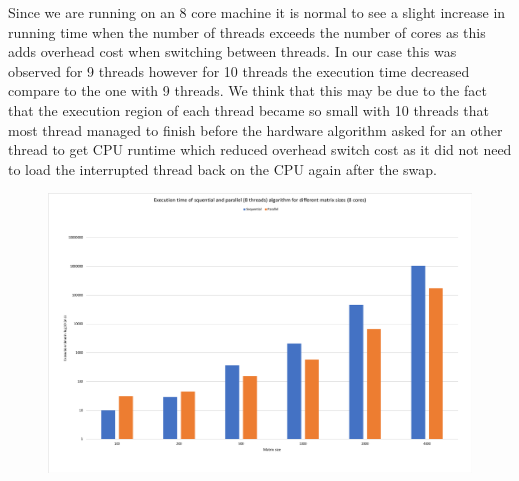 \documentclass[11pt,letterpaper]{exam}
\begin{document}
\begin{questions}
			\quad Since we are running on an 8 core machine it is normal to see a slight increase in running time when the number of threads exceeds the number of cores as this adds overhead cost when switching between threads. In our case this was observed for 9 threads however for 10 threads the execution time decreased compare to the one with 9 threads. We think that this may be due to the fact that the execution region of each thread became so small with 10 threads that most thread managed to finish before the hardware algorithm asked for an other thread to get CPU runtime which reduced overhead switch cost as it did not need to load the interrupted thread back on the CPU again after the swap.
			\begin{figure}[h!]
				\centering
				\includegraphics[scale=0.4]{ExectionParallelSequential}
			\end{figure}


\end{questions}
\end{document}
